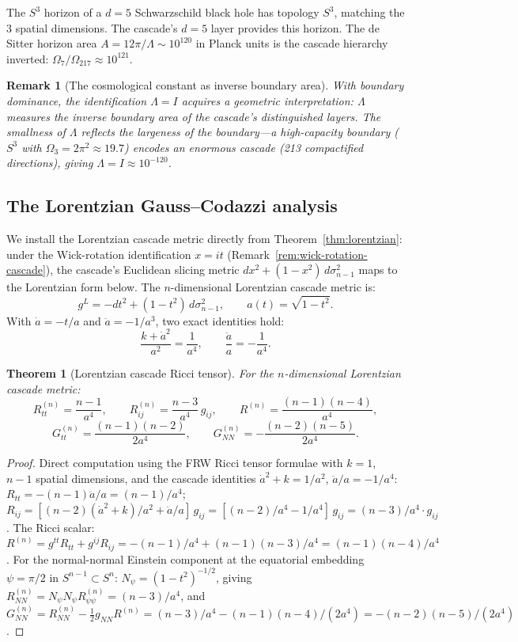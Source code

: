 \documentclass[12pt,a4paper]{article}
\newtheorem{theorem}{Theorem}[section]
\newtheorem*{remark}{Remark}
\begin{document}
The $S^3$ horizon of a $d = 5$ Schwarzschild black hole has topology $S^3$, matching the 3
spatial dimensions. The cascade's $d = 5$ layer provides this horizon. The de Sitter horizon
area $A = 12\pi/\Lambda \sim 10^{120}$ in Planck units is the cascade hierarchy inverted: $\Omega_7/\Omega_{217} \approx 10^{121}$.

\begin{remark}[The cosmological constant as inverse boundary area]
With boundary
dominance, the identification $\Lambda = I$ acquires a geometric interpretation: $\Lambda$ measures the
inverse boundary area of the cascade's distinguished layers. The smallness of $\Lambda$ reflects the
largeness of the boundary---a high-capacity boundary ($S^3$ with $\Omega_3 = 2\pi^2 \approx 19.7$) encodes
an enormous cascade (213 compactified directions), giving $\Lambda = I \approx 10^{-120}$.
\end{remark}

\subsection{The Lorentzian Gauss--Codazzi analysis}

We install the Lorentzian cascade metric directly from
Theorem~\ref{thm:lorentzian}: under the Wick-rotation identification
$x = it$ (Remark~\ref{rem:wick-rotation-cascade}), the cascade's
Euclidean slicing metric $dx^2 + (1-x^2)\,d\sigma_{n-1}^2$ maps to the
Lorentzian form below. The $n$-dimensional Lorentzian cascade metric is:
\[
g^L = -dt^2 + (1 - t^2)\,d\sigma_{n-1}^2, \qquad a(t) = \sqrt{1 - t^2}.
\]
With $\dot{a} = -t/a$ and $\ddot{a} = -1/a^3$, two exact identities hold:
\[
\frac{k + \dot{a}^2}{a^2} = \frac{1}{a^4}, \qquad \frac{\ddot{a}}{a} = -\frac{1}{a^4}.
\]

\begin{theorem}[Lorentzian cascade Ricci tensor]
For the $n$-dimensional Lorentzian cascade metric:
\[
R^{(n)}_{tt} = \frac{n - 1}{a^4}, \qquad R^{(n)}_{ij} = \frac{n - 3}{a^4}\,g_{ij}, \qquad R^{(n)} = \frac{(n - 1)(n - 4)}{a^4},
\]
\[
G^{(n)}_{tt} = \frac{(n - 1)(n - 2)}{2a^4}, \qquad G^{(n)}_{NN} = -\frac{(n - 2)(n - 5)}{2a^4}.
\]
\end{theorem}

\begin{proof}
Direct computation using the FRW Ricci tensor formulae with $k = 1$, $n - 1$ spatial
dimensions, and the cascade identities $\dot{a}^2 + k = 1/a^2$, $\ddot{a}/a = -1/a^4$: $R_{tt} = -(n - 1)\ddot{a}/a =
(n - 1)/a^4$; $R_{ij} = [(n - 2)(\dot{a}^2 + k)/a^2 + \ddot{a}/a]\,g_{ij} = [(n - 2)/a^4 - 1/a^4]\,g_{ij} = (n - 3)/a^4 \cdot g_{ij}$. The
Ricci scalar: $R^{(n)} = g^{tt}R_{tt} + g^{ij}R_{ij} = -(n - 1)/a^4 + (n - 1)(n - 3)/a^4 = (n - 1)(n - 4)/a^4$.
For the normal-normal Einstein component at the equatorial embedding $\psi = \pi/2$ in
$S^{n-1} \subset S^n$: $N_\psi = (1 - t^2)^{-1/2}$, giving $R^{(n)}_{NN} = N_\psi N_\psi R^{(n)}_{\psi\psi} = (n - 3)/a^4$, and $G^{(n)}_{NN} =
R^{(n)}_{NN} - \tfrac{1}{2}g_{NN}R^{(n)} = (n - 3)/a^4 - (n - 1)(n - 4)/(2a^4) = -(n - 2)(n - 5)/(2a^4)$.
\end{proof}
\end{document}
